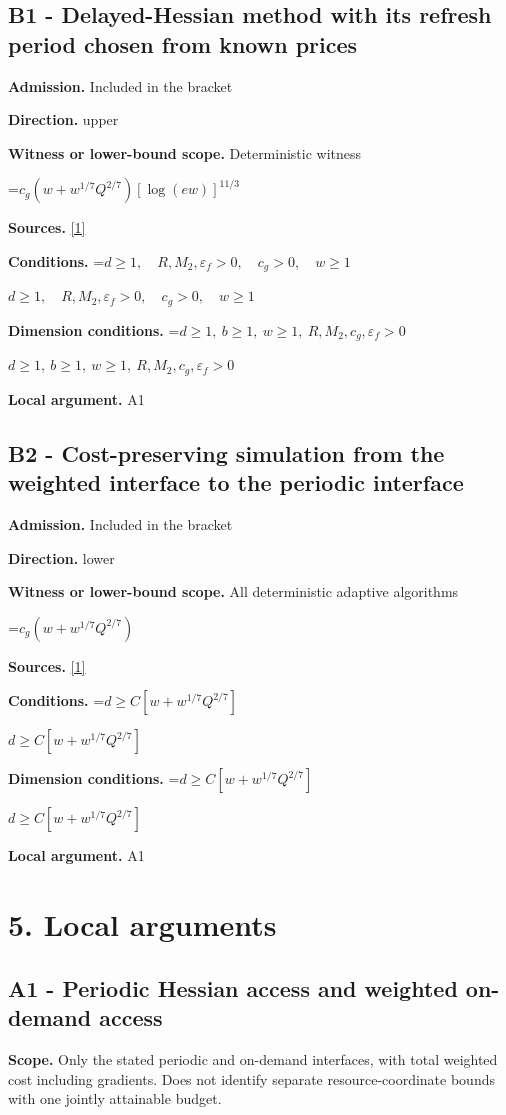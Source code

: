 \documentclass[10pt,a4paper]{article}
\newcommand{\AtlasMath}[1]{\par\begingroup\centering\setbox0=\hbox{$\displaystyle #1$}\ifdim\wd0>1.4\linewidth\typeout{ATLAS WIDE FORMULA: \the\wd0}\fi\ifdim\wd0>\linewidth\resizebox{\linewidth}{!}{\box0}\else\box0\fi\par\endgroup}
\newcommand{\AtlasInlineMath}[1]{\begingroup\setbox0=\hbox{$#1$}\ifdim\wd0>.4\linewidth\endgroup\AtlasMath{#1}\else\endgroup$#1$\fi}
\begin{document}
\subsection{B1 - Delayed-Hessian method with its refresh period chosen from known prices}
\textbf{Admission.} Included in the bracket

\textbf{Direction.} upper

\textbf{Witness or lower-bound scope.} Deterministic witness

\AtlasMath{c_g(w+w^{1/7}Q^{2/7})[\log(ew)]^{11/3}}
\textbf{Sources.} \href{https://arxiv.org/abs/2610.03222v1}{[1]}

\textbf{Conditions.} \AtlasInlineMath{d\ge1,\quad R,M_2,\varepsilon_f>0,\quad c_g>0,\quad w\ge1}

\textbf{Dimension conditions.} \AtlasInlineMath{d\ge1,\ b\ge1,\ w\ge1,\ R,M_2,c_g,\varepsilon_f>0}

\textbf{Local argument.} A1

\subsection{B2 - Cost-preserving simulation from the weighted interface to the periodic interface}
\textbf{Admission.} Included in the bracket

\textbf{Direction.} lower

\textbf{Witness or lower-bound scope.} All deterministic adaptive algorithms

\AtlasMath{c_g(w+w^{1/7}Q^{2/7})}
\textbf{Sources.} \href{https://arxiv.org/abs/2610.03222v1}{[1]}

\textbf{Conditions.} \AtlasInlineMath{d\ge C[w+w^{1/7}Q^{2/7}]}

\textbf{Dimension conditions.} \AtlasInlineMath{d\ge C[w+w^{1/7}Q^{2/7}]}

\textbf{Local argument.} A1

\section{5. Local arguments}
\subsection{A1 - Periodic Hessian access and weighted on-demand access}
\textbf{Scope.} Only the stated periodic and on-demand interfaces, with total weighted cost including gradients. Does not identify separate resource-coordinate bounds with one jointly attainable budget.
\end{document}
